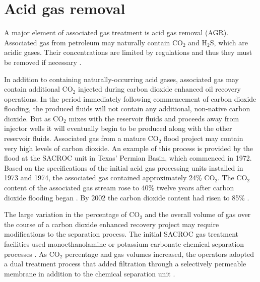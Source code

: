 \documentclass[11pt]{report}
\begin{document}
\begin{landscape}
\begin{tiny}
\begin{threeparttable}
\begin{supertabular*}{1\columnwidth}{p{0.05\columnwidth}p{0.3\columnwidth}p{0.25\columnwidth}p{0.05\columnwidth}p{0.15\columnwidth}p{0.05\columnwidth}p{0.05\columnwidth}p{0.025\columnwidth}}
\end{supertabular*}
\end{threeparttable}
\end{tiny}

\end{landscape}

\clearpage

\section{Acid gas removal}
\label{sec:AGR}

A major element of associated gas treatment is acid gas removal (AGR). Associated gas from petroleum may naturally contain CO$_{2}$ and H$_{2}$S, which are acidic gases. Their concentrations are limited by regulations and thus they must be removed if necessary \cite[p. 211-213]{FundNatGasProcessing}.



In addition to containing naturally-occurring acid gases, associated gas may contain additional CO$_{2}$ injected during carbon dioxide enhanced oil recovery operations. In the period immediately following commencement of carbon dioxide flooding, the produced fluids will not contain any additional, non-native carbon dioxide. But as CO$_{2}$ mixes with the reservoir fluids and proceeds away from injector wells it will eventually begin to be produced along with the other reservoir fluids. Associated gas from a mature CO$_{2}$ flood project may contain very high levels of carbon dioxide. An example of this process is provided by the flood at the SACROC unit in Texas' Permian Basin, which commenced in 1972. Based on the specifications of the initial acid gas processing units installed in 1973 and 1974, the associated gas contained approximately 24\% CO$_{2}$. The CO$_{2}$ content of the associated gas stream rose to 40\% twelve years after carbon dioxide flooding began \cite{Parro1984}. By 2002 the carbon dioxide content had risen to 85\% \cite{Guntis2002}.

The large variation in the percentage of CO$_{2}$ and the overall volume of gas over the course of a carbon dioxide enhanced recovery project may require modifications to the separation process. The initial SACROC gas treatment facilities used monoethanolamine or potassium carbonate chemical separation processes \cite{Guntis2002}. As CO$_{2}$ percentage and gas volumes increased, the operators adopted a dual treatment process that added filtration through a selectively permeable membrane in addition to the chemical separation unit \cite{Parro1984}.
\end{document}

